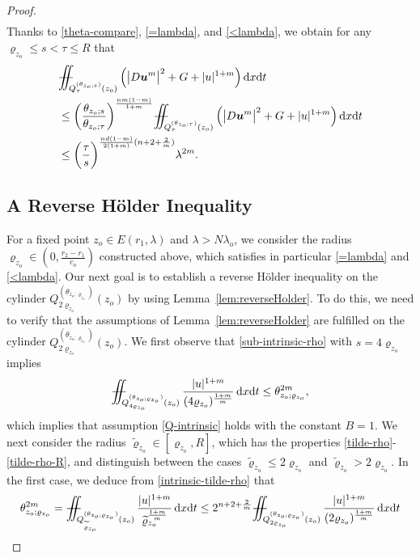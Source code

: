 \documentclass[a4paper, 10pt, american]{amsart}
\numberwithin{theorem}{section}
\numberwithin{equation}{section}
\newcommand{\dxdt}{\,\mathrm{d}x\mathrm{d}t}
\renewcommand{\rho}{\varrho}
\newcommand{\power}[2]{\bm{#1^{\mbox{\unboldmath{\scriptsize$#2$}}}}}
\def\Xiint#1{\mathchoice
    {\XXiint\displaystyle\textstyle{#1}}%
    {\XXiint\textstyle\scriptstyle{#1}}%
    {\XXiint\scriptstyle\scriptscriptstyle{#1}}%
    {\XXiint\scriptscriptstyle\scriptscriptstyle{#1}}%
    \!\iint}
\def\XXiint#1#2#3{\setbox0=\hbox{$#1{#2#3}{\iint}$}
    \vcenter{\hbox{$#2#3$}}\kern-0.5\wd0}
\def\biint{\Xiint{-\!-}}
\def\Tilde{\widetilde}
\begin{document}
\begin{proof}
\begin{align}
\end{align}
Thanks to \eqref{theta-compare}, \eqref{=lambda}, and \eqref{<lambda}, we obtain for any $\rho_{z_o}\le s<\tau\le R$ that
\begin{align}\label{<lambda-1}
	&\biint_{Q_{\tau}^{(\theta_{z_o;s})}(z_o)} 
	\Big(\big|D\power{u}{m}\big|^2 + G+|u|^{1+m}\Big) \dxdt\\\nonumber
	&\le
	\bigg(\frac{\theta_{z_o;s}}{\theta_{z_o;\tau}}\bigg)^\frac{nm(1-m)}{1+m}
	\biint_{Q_{\tau}^{(\theta_{z_o;\tau})}(z_o)} 
	\Big(\big|D\power{u}{m}\big|^2 + G+|u|^{1+m}\Big) \dxdt\\\nonumber
	&\le
	\bigg(\frac\tau s \bigg)^{\frac{nd(1-m)}{2(1+m)}(n+2+\frac2m)} \lambda^{2m}.
\end{align}



\subsection{A Reverse H\"older Inequality}
For a fixed point $z_o\in E(r_1,\lambda)$ and $\lambda>N\lambda_o$, we consider the
radius
$\rho_{z_o}\in(0,\frac{r_2-r_1}{c_o})$ constructed above, which
satisfies in particular \eqref{=lambda} and \eqref{<lambda}.
Our next goal is to establish a reverse H\"older inequality on the
cylinder $Q_{2\rho_{z_o}}^{(\theta_{z_o;\rho_{z_o}})}(z_o)$ by using
Lemma~\ref{lem:reverseHolder}. To do this, we need to verify that the
assumptions of Lemma~\ref{lem:reverseHolder} are fulfilled on the
cylinder $Q_{2\rho_{z_o}}^{(\theta_{z_o;\rho_{z_o}})}(z_o)$.
We first observe that \eqref{sub-intrinsic-rho} with $s=4\rho_{z_o}$
implies 
\begin{align}
\biint_{Q_{4\rho_{z_o}}^{(\theta_{z_o;\rho_{z_o}})}(z_o)} \frac{|u|^{1+m}}{(4\rho_{z_o})^\frac{1+m}m}\dxdt
\le
\theta_{z_o;\rho_{z_o}}^{2m},
\end{align}
which implies that assumption \eqref{Q-intrinsic} holds with the constant $B=1$.
We next consider the radius $\Tilde \rho_{z_o}\in[\rho_{z_o},R]$,
which has the properties \eqref{tilde-rho}-\eqref{tilde-rho-R},
and distinguish between the cases $\Tilde\rho_{z_o}\le2\rho_{z_o}$ and $\Tilde\rho_{z_o}>2\rho_{z_o}$.
In the first case, we deduce from \eqref{intrinsic-tilde-rho} that
\begin{align}
\theta_{z_o;\rho_{z_o}}^{2m}
=
\biint_{Q_{\Tilde\rho_{z_o}}^{(\theta_{z_o;\rho_{z_o}})}(z_o)} \frac{|u|^{1+m}}{\Tilde\rho_{z_o}^\frac{1+m}m}\dxdt
\le
2^{n+2+\frac2m}
\biint_{Q_{{2\rho}_{z_o}}^{(\theta_{z_o;\rho_{z_o}})}(z_o)} \frac{|u|^{1+m}}{(2\rho_{z_o})^\frac{1+m}m}\dxdt

\end{align}
\end{proof}
\end{document}
